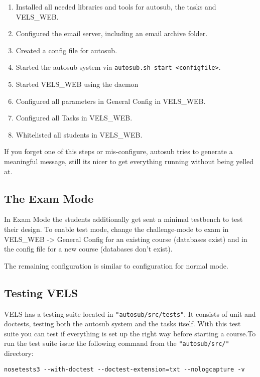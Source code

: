 \begin{enumerate}
\item Installed all needed libraries and tools for autosub, the tasks and VELS\_WEB.
\item Configured the email server, including an email archive folder.
\item Created a config file for autosub.
\item Started the autosub system via {\tt autosub.sh start <configfile>}.
\item Started VELS\_WEB using the daemon 
\item Configured all parameters in General Config in VELS\_WEB.
\item Configured all Tasks in VELS\_WEB.
\item Whitelisted all students in VELS\_WEB.
\end{enumerate}

If you forget one of this steps or mis-configure, autosub tries to generate a meaningful
message, still its nicer to get everything running without being yelled at.

\subsection{The Exam Mode}\label{sub:exammode}
In Exam Mode the students additionally get sent a minimal testbench to test their design.
To enable test mode, change the challenge-mode to exam in VELS\_WEB -> General Config for
an existing course (databases exist) and in the config file for a new course (databases
don't exist).

The remaining configuration is similar to configuration for normal mode.

\subsection{Testing VELS}\label{sub:testingvels}


VELS has a testing suite located in {\tt "autosub/src/tests"}. It consists of unit and
doctests, testing both the autosub system and the tasks itself. With this test suite you
can test if everything is set up the right way before starting a course.To run the test
suite issue the following command from the {\tt "autosub/src/"} directory:

\begin{verbatim}
nosetests3 --with-doctest --doctest-extension=txt --nologcapture -v
\end{verbatim}


